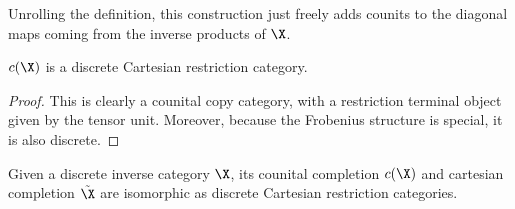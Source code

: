 Unrolling the definition, this construction just freely adds counits to the diagonal maps coming from the inverse products of $\X$. 

\begin{lemma}
$c(\X)$ is a discrete Cartesian restriction category.
\end{lemma}
\begin{proof}
This is clearly a counital copy category, with a restriction terminal object given by the tensor unit.  Moreover, because the Frobenius structure is special, it is also discrete.
\end{proof}



\begin{lemma}
\label{lemma:envstruct}
Given a discrete inverse category $\X$, its counital completion $c(\X)$ and  cartesian completion $\tilde \X$ are isomorphic as discrete Cartesian restriction categories.
\end{lemma}

